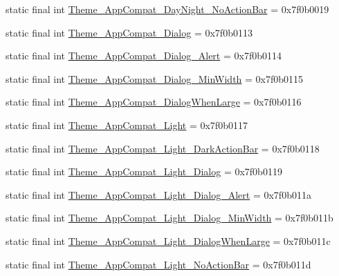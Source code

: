 \begin{CompactItemize}
\item 
static final int \hyperlink{classandroid_1_1support_1_1v7_1_1palette_1_1_r_1_1style_396768fc49bc0d4fbe0df050048599c1}{Theme\_\-AppCompat\_\-DayNight\_\-NoActionBar} = 0x7f0b0019
\item 
static final int \hyperlink{classandroid_1_1support_1_1v7_1_1palette_1_1_r_1_1style_f2da66eead44398e61766976747184f1}{Theme\_\-AppCompat\_\-Dialog} = 0x7f0b0113
\item 
static final int \hyperlink{classandroid_1_1support_1_1v7_1_1palette_1_1_r_1_1style_7db1c1336c59e1dbf30fccdb29fdad83}{Theme\_\-AppCompat\_\-Dialog\_\-Alert} = 0x7f0b0114
\item 
static final int \hyperlink{classandroid_1_1support_1_1v7_1_1palette_1_1_r_1_1style_52ee1ed33c197da448118a085ee5ce8e}{Theme\_\-AppCompat\_\-Dialog\_\-MinWidth} = 0x7f0b0115
\item 
static final int \hyperlink{classandroid_1_1support_1_1v7_1_1palette_1_1_r_1_1style_ac38a3252b5df552df7c1b57e26102cf}{Theme\_\-AppCompat\_\-DialogWhenLarge} = 0x7f0b0116
\item 
static final int \hyperlink{classandroid_1_1support_1_1v7_1_1palette_1_1_r_1_1style_789e493505a4c6a59674facb376e2773}{Theme\_\-AppCompat\_\-Light} = 0x7f0b0117
\item 
static final int \hyperlink{classandroid_1_1support_1_1v7_1_1palette_1_1_r_1_1style_9284d63ada92600a3b3b4256fe03b308}{Theme\_\-AppCompat\_\-Light\_\-DarkActionBar} = 0x7f0b0118
\item 
static final int \hyperlink{classandroid_1_1support_1_1v7_1_1palette_1_1_r_1_1style_3f18e5aaf3ccba9c3b5fbb0902d5c60b}{Theme\_\-AppCompat\_\-Light\_\-Dialog} = 0x7f0b0119
\item 
static final int \hyperlink{classandroid_1_1support_1_1v7_1_1palette_1_1_r_1_1style_23db553ae2f7ed35973911c5841ba623}{Theme\_\-AppCompat\_\-Light\_\-Dialog\_\-Alert} = 0x7f0b011a
\item 
static final int \hyperlink{classandroid_1_1support_1_1v7_1_1palette_1_1_r_1_1style_34fae0c1060cbb6252bfc374f86c0e24}{Theme\_\-AppCompat\_\-Light\_\-Dialog\_\-MinWidth} = 0x7f0b011b
\item 
static final int \hyperlink{classandroid_1_1support_1_1v7_1_1palette_1_1_r_1_1style_4d305aeb7c2d566eb63a9089095008a3}{Theme\_\-AppCompat\_\-Light\_\-DialogWhenLarge} = 0x7f0b011c
\item 
static final int \hyperlink{classandroid_1_1support_1_1v7_1_1palette_1_1_r_1_1style_e14f48e0011e502f51ee9ccbfa61a3ab}{Theme\_\-AppCompat\_\-Light\_\-NoActionBar} = 0x7f0b011d

\end{CompactItemize}
